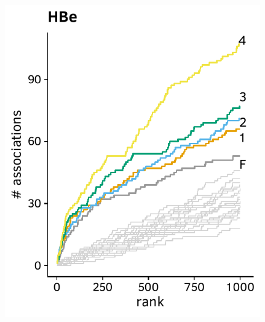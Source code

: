 \documentclass[a4paper,11pt]{article}
\begin{document}
\begin{figure}[H]
    \begin{minipage}{.49\textwidth}
      \includegraphics[width=\linewidth]{plots/comparison_plots/hbv_duesseldorf/HBe_new_map.pdf}
    \end{minipage}
    \begin{minipage}{.49\textwidth}

\end{minipage}
\end{figure}
\end{document}
